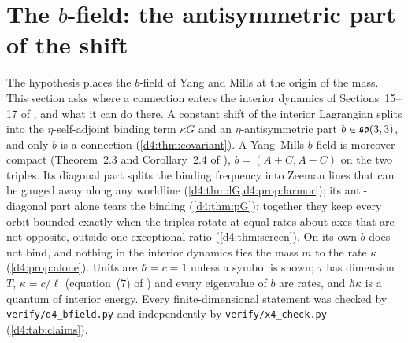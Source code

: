 \section{\texorpdfstring{The $b$-field: the antisymmetric part of the shift}{The b-field: the antisymmetric part of the shift}}
\label{d4:sec:bfield}

The hypothesis places the $b$-field of Yang and Mills \cite{YangMills54} at the origin of the mass. This section asks where a connection
enters the interior dynamics of Sections~15--17 of \cite{ES17}, and what it can do there. A constant shift of the interior Lagrangian splits
into the $\eta$-self-adjoint binding term $\kappa G$ and an $\eta$-antisymmetric part $b\in\mathfrak{so}(3,3)$, and only $b$ is a connection
(\cref{d4:thm:covariant}). A Yang--Mills $b$-field is moreover compact (Theorem~2.3 and Corollary~2.4 of \cite{ES17}), $b=(A+C,A-C)$ on the two
triples. Its diagonal part splits the binding frequency into Zeeman lines that can be gauged away along any worldline
(\cref{d4:thm:lG,d4:prop:larmor}); its anti-diagonal part alone tears the binding (\cref{d4:thm:pG}); together they keep every orbit bounded
exactly when the triples rotate at equal rates about axes that are not opposite, outside one exceptional ratio (\cref{d4:thm:screen}). On its
own $b$ does not bind, and nothing in the interior dynamics ties the mass $m$ to the rate $\kappa$ (\cref{d4:prop:alone}). Units are $\hbar=c=1$
unless a symbol is shown; $\tau$ has dimension $T$, $\kappa=c/\ell$ (equation~(7) of \cite{ES17}) and every eigenvalue of $b$ are rates, and
$\hbar\kappa$ is a quantum of interior energy. Every finite-dimensional statement was checked by \texttt{verify/d4\_bfield.py} and
independently by \texttt{verify/x4\_check.py} (\cref{d4:tab:claims}).

